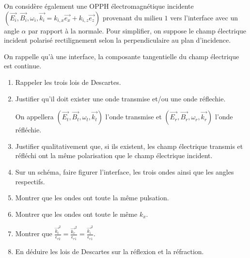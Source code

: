 On considère également une OPPH électromagnétique incidente $(\vec{E_i}, \vec{B_i}, \omega_i, \vec{k_i} = k_{i,x}\vec{e_x} + k_{i, z}\vec{e_z})$ provenant du milieu $1$ vers l'interface avec un angle $\alpha$ par rapport à la normale. Pour simplifier, on suppose le champ électrique incident polarisé rectilignement selon la perpendiculaire au plan d'incidence.

On rappelle qu'à une interface, la composante tangentielle du champ électrique est continue.

\begin{enumerate}
	\item Rappeler les trois lois de Descartes.
	
	\item Justifier qu'il doit exister une onde transmise et/ou une onde réflechie. 

	On appellera $(\vec{E_t}, \vec{B_t}, \omega_t, \vec{k_t})$ l'onde transmise et $(\vec{E_r}, \vec{B_r}, \omega_r, \vec{k_r})$ l'onde réfléchie. 
	
	\item Justifier qualitativement que, si ils existent, les champ électrique transmis et réfléchi ont la même polarisation que le champ électrique incident.
	
	\item Sur un schéma, faire figurer l'interface, les trois ondes ainsi que les angles respectifs.
	
	\item Montrer que les ondes ont toute la même pulsation.
	
	\item Montrer que les ondes ont toute le même $k_x$.
	
	\item Montrer que $\frac{\vec{k_t}^2}{\epsilon_{r2}} = \frac{\vec{k_r}^2}{\epsilon_{r1}} = \frac{\vec{k_i}^2}{\epsilon_{r1}}$.
	
	\item En déduire les lois de Descartes sur la réflexion et la réfraction.
\end{enumerate}